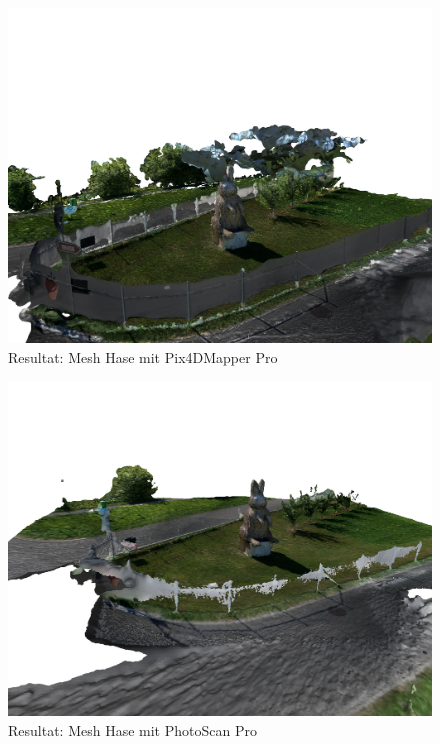 
\begin{figure}[p]
	\centerline{
		\includegraphics[width=20cm,angle=90]{images/rabbit-mesh-pix4d.png}
	}
	\caption{Resultat: Mesh Hase mit Pix4DMapper Pro}
	\label{img:rabbit-mesh-pix4d}
\end{figure}

\begin{figure}[p]
	\centerline{
		\includegraphics[width=20cm,angle=90]{images/rabbit-mesh-photoscan.png}
	}
	\caption{Resultat: Mesh Hase mit PhotoScan Pro}
	\label{img:rabbit-mesh-photoscan}
\end{figure}

